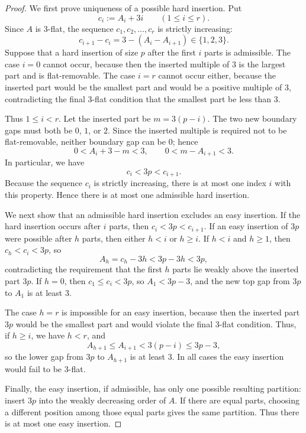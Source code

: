 \documentclass[11pt]{amsart}
\theoremstyle{definition}
\theoremstyle{remark}
\begin{document}
\begin{proof}
We first prove uniqueness of a possible hard insertion.  Put
\[
        c_i:=A_i+3i \qquad (1\le i\le r).
\]
Since \(A\) is \(3\)-flat, the sequence \(c_1,c_2,\ldots,c_r\) is strictly
increasing:
\[
        c_{i+1}-c_i=3-(A_i-A_{i+1})\in\{1,2,3\}.
\]
Suppose that a hard insertion of size \(p\) after the first \(i\) parts is
admissible.  The case \(i=0\) cannot occur, because then the inserted multiple
of \(3\) is the largest part and is flat-removable.  The case \(i=r\) cannot
occur either, because the inserted part would be the smallest part and would be
a positive multiple of \(3\), contradicting the final \(3\)-flat condition
that the smallest part be less than \(3\).

Thus \(1\le i<r\).  Let the inserted part be \(m=3(p-i)\).  The two new
boundary gaps must both be \(0\), \(1\), or \(2\).  Since the inserted multiple
is required not to be flat-removable, neither boundary gap can be \(0\); hence
\[
        0< A_i+3-m<3,
        \qquad
        0< m-A_{i+1}<3.
\]
In particular, we have
\[
        c_i<3p<c_{i+1}.
\]
Because the sequence \(c_i\) is strictly increasing, there is at most one index
\(i\) with this property.  Hence there is at most one admissible hard insertion.

We next show that an admissible hard insertion excludes an easy insertion.  If
the hard insertion occurs after \(i\) parts, then \(c_i<3p<c_{i+1}\).  If an
easy insertion of \(3p\) were possible after \(h\) parts, then either \(h<i\)
or \(h\ge i\).  If \(h<i\) and \(h\ge1\), then \(c_h<c_i<3p\), so
\[
        A_h=c_h-3h<3p-3h<3p,
\]
contradicting the requirement that the first \(h\) parts lie weakly above the
inserted part \(3p\).  If \(h=0\), then \(c_1\le c_i<3p\), so
\(A_1<3p-3\), and the new top gap from \(3p\) to \(A_1\) is at least \(3\).

The case \(h=r\) is impossible for an easy insertion, because then the inserted
part \(3p\) would be the smallest part and would violate the final \(3\)-flat
condition.  Thus, if \(h\ge i\), we have \(h<r\), and
\[
        A_{h+1}\le A_{i+1}<3(p-i)\le 3p-3,
\]
so the lower gap from \(3p\) to \(A_{h+1}\) is at least \(3\).  In all cases
the easy insertion would fail to be \(3\)-flat.

Finally, the easy insertion, if admissible, has only one possible resulting
partition: insert \(3p\) into the weakly decreasing order of \(A\).  If there
are equal parts, choosing a different position among those equal parts gives
the same partition.  Thus there is at most one easy insertion.
\end{proof}
\end{document}
